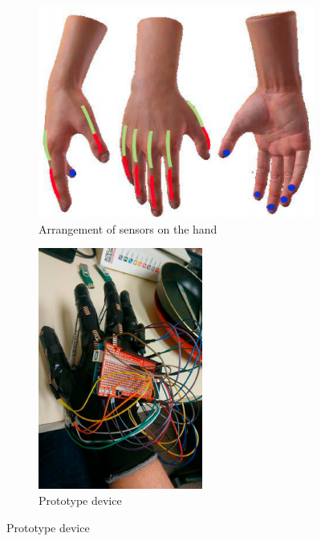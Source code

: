 \documentclass[hyperref, bachelorofscience]{cgvpub}
\begin{document}
\begin{figure}[b!]
	\begin{subfigure}{.57\linewidth}
		\includegraphics[width=\linewidth]{../pics/maitre_sensors}
		\caption{Arrangement of sensors on the hand}
		\label{fig:maitre_sensors}
	\end{subfigure}
	\hfill
	\begin{subfigure}{.3\linewidth}
		\includegraphics[width=\linewidth]{../pics/maitre_glove}
		\caption{Prototype device}
		\label{fig:maitre_glove}
	\end{subfigure}


\end{figure}
\end{document}
